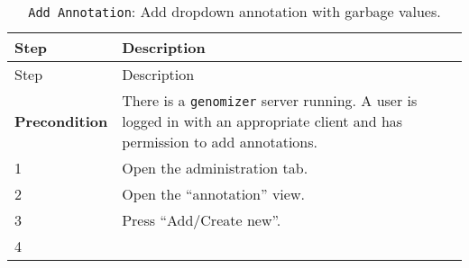 \begin{longtable}[c]{@{}ll@{}}
\caption{\texttt{Add\ Annotation}: Add dropdown annotation with garbage
values.}\tabularnewline
\toprule
\begin{minipage}[b]{0.31\columnwidth}\raggedright\strut
Step
\strut\end{minipage} &
\begin{minipage}[b]{0.63\columnwidth}\raggedright\strut
Description
\strut\end{minipage}\tabularnewline
\midrule
\endfirsthead
\toprule
\begin{minipage}[b]{0.31\columnwidth}\raggedright\strut
Step
\strut\end{minipage} &
\begin{minipage}[b]{0.63\columnwidth}\raggedright\strut
Description
\strut\end{minipage}\tabularnewline
\midrule
\endhead
\begin{minipage}[t]{0.31\columnwidth}\raggedright\strut
\textbf{Precondition}
\strut\end{minipage} &
\begin{minipage}[t]{0.63\columnwidth}\raggedright\strut
There is a \texttt{genomizer} server running. A user is logged in with
an appropriate client and has permission to add annotations.
\strut\end{minipage}\tabularnewline
\begin{minipage}[t]{0.31\columnwidth}\raggedright\strut
1
\strut\end{minipage} &
\begin{minipage}[t]{0.63\columnwidth}\raggedright\strut
Open the administration tab.
\strut\end{minipage}\tabularnewline
\begin{minipage}[t]{0.31\columnwidth}\raggedright\strut
2
\strut\end{minipage} &
\begin{minipage}[t]{0.63\columnwidth}\raggedright\strut
Open the ``annotation'' view.
\strut\end{minipage}\tabularnewline
\begin{minipage}[t]{0.31\columnwidth}\raggedright\strut
3
\strut\end{minipage} &
\begin{minipage}[t]{0.63\columnwidth}\raggedright\strut
Press ``Add/Create new''.
\strut\end{minipage}\tabularnewline
\begin{minipage}[t]{0.31\columnwidth}\raggedright\strut
4
\strut\end{minipage} &

\end{longtable}
